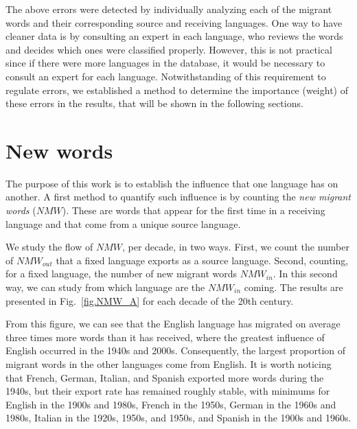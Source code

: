 \documentclass[10pt,letterpaper]{article} %
\newcommand{\Fref}[1]{Fig.~\ref{#1}}
\begin{document}
The above errors were detected by individually analyzing each of the migrant
words and their corresponding source and receiving languages. One way to have
cleaner data is by consulting an expert in each language, who reviews the words
and decides which ones were classified properly. However, this is not practical
since if there were more languages in the database, it would be necessary to
consult an expert for each language. Notwithstanding of this requirement to
regulate errors, we established a method to determine the importance (weight)
of these errors in the results, that will be shown in the following sections. 
\section*{New words} %
 
The purpose of this work is to establish the influence that one language has on
another. A first method to quantify such influence is by counting the
\textit{new migrant words} ($NMW$). These are words that appear for the first time in a
receiving language and that come from a unique source language.


We study the flow of $NMW$, per decade, in two ways. First, we
count the number of $NMW_{out}$ that a fixed language exports as a source
language. Second, counting, for a fixed language, the number
of new migrant words $NMW_{in}$. In this second way, we can study from 
which language are the $NMW_{in}$ coming.  The results are presented in 
\Fref{fig.NMW_A} for each decade of the 20th century. 

% 

From this figure, we can see that the English language has
migrated on average three times more words than it has received, where the
greatest influence of English occurred in the 1940s and 2000s.
Consequently, the largest proportion of migrant words in the other languages come
from English. It is worth noticing that French, German, Italian, and Spanish exported more words
during the 1940s, but their export rate has remained roughly stable, with minimums for English in the 1900s and 1980s, French in the 1950s, German in the 1960s and 1980s, Italian in the 1920s, 1950s, and 1950s, and Spanish in the 1900s and 1960s.
\end{document}
